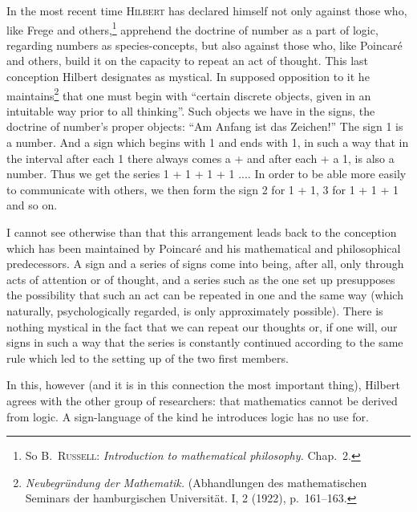 \documentclass[12pt]{book}
\newcommand{\opage}[1]{\marginnote{\footnotesize\textit{[#1]}}}
\begin{document}
In the most recent time \textsc{Hilbert} has declared himself not only against
those who, like Frege and others,\footnote{So B.\ \textsc{Russell:}
\textit{Introduction to mathematical philosophy.} Chap.\ 2.} apprehend the
doctrine of number as a part of logic, regarding numbers as species-concepts, but
also against those who, like Poincaré and others, build it on the capacity to
repeat an act of thought. This last conception Hilbert designates as mystical. In
supposed opposition to it he maintains\footnote{\textit{Neubegründung der
Mathematik.} (Abhandlungen des mathematischen Seminars der hamburgischen
Universität. I, 2 (1922), p.\ 161--163.} that one must begin with ``certain
discrete objects, given in an intuitable way prior to all thinking''. Such
objects we have in the signs, the doctrine of number's proper objects: ``Am Anfang
ist das Zeichen!'' The sign 1 is a number. And a sign which begins with 1 and ends
with 1, in such a way that in the interval after each 1 there always comes a +
and after each + a 1, is also a \opage{84}number. Thus we get the series 1 + 1 + 1 + 1 ....
In order to be able more easily to communicate with others, we then form the sign
2 for 1 + 1, 3 for 1 + 1 + 1 and so on.

I cannot see otherwise than that this arrangement leads back to the conception
which has been maintained by Poincaré and his mathematical and philosophical
predecessors. A sign and a series of signs come into being, after all, only
through acts of attention or of thought, and a series such as the one set up
presupposes the possibility that such an act can be repeated in one and the same
way (which naturally, psychologically regarded, is only approximately possible).
There is nothing mystical in the fact that we can repeat our thoughts or, if one
will, our signs in such a way that the series is constantly continued according to
the same rule which led to the setting up of the two first members.

In this, however (and it is in this connection the most important thing), Hilbert
agrees with the other group of researchers: that mathematics cannot be derived
from logic. A sign-language of the kind he introduces logic has no use for.
\end{document}
